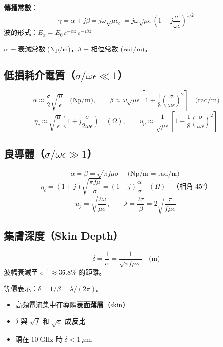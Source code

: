 \documentclass[12pt,a4paper]{article}
\begin{document}
\textbf{傳播常數}：
\[
\gamma = \alpha + j\beta = j\omega\sqrt{\mu\epsilon_c} = j\omega\sqrt{\mu\epsilon}\left(1-j\frac{\sigma}{\omega\epsilon}\right)^{1/2}
\]
波的形式：$E_x = E_0\,e^{-\alpha z}\,e^{-j\beta z}$

$\alpha$ = 衰減常數 (Np/m)，$\beta$ = 相位常數 (rad/m)。

\subsection{低損耗介電質（$\sigma/\omega\epsilon \ll 1$）}

\begin{keybox}[低損耗介電質公式]
\[
\alpha \approx \frac{\sigma}{2}\sqrt{\frac{\mu}{\epsilon}} \quad\text{(Np/m)}, \qquad
\beta \approx \omega\sqrt{\mu\epsilon}\left[1+\frac{1}{8}\left(\frac{\sigma}{\omega\epsilon}\right)^2\right] \quad\text{(rad/m)}
\]
\[
\eta_c \approx \sqrt{\frac{\mu}{\epsilon}}\left(1+j\frac{\sigma}{2\omega\epsilon}\right) \quad(\Omega), \qquad
u_p \approx \frac{1}{\sqrt{\mu\epsilon}}\left[1-\frac{1}{8}\left(\frac{\sigma}{\omega\epsilon}\right)^2\right]
\]
\end{keybox}

\subsection{良導體（$\sigma/\omega\epsilon \gg 1$）}

\begin{keybox}[良導體公式]
\[
\alpha = \beta = \sqrt{\pi f\mu\sigma} \quad\text{(Np/m $=$ rad/m)}
\]
\[
\eta_c = (1+j)\sqrt{\frac{\pi f\mu}{\sigma}} = (1+j)\frac{\alpha}{\sigma} \quad(\Omega) \quad\text{（相角 $45°$）}
\]
\[
u_p = \sqrt{\frac{2\omega}{\mu\sigma}}, \qquad
\lambda = \frac{2\pi}{\beta} = 2\sqrt{\frac{\pi}{f\mu\sigma}}
\]
\end{keybox}

\subsection{集膚深度（Skin Depth）}

\begin{keybox}[集膚深度]
\[
\boxed{\delta = \frac{1}{\alpha} = \frac{1}{\sqrt{\pi f\mu\sigma}}} \quad\text{(m)}
\]
波幅衰減至 $e^{-1} \approx 36.8\%$ 的距離。

等價表示：$\delta = 1/\beta = \lambda/(2\pi)$。
\end{keybox}

\begin{tipbox}[集膚深度的物理意義]
\begin{itemize}[nosep]
  \item 高頻電流集中在導體\textbf{表面薄層}（skin）
  \item $\delta$ 與 $\sqrt{f}$ 和 $\sqrt{\sigma}$ 成\textbf{反比}
  \item 銅在 $10\;\text{GHz}$ 時 $\delta < 1\;\mu\text{m}$
\end{itemize}
\end{tipbox}
\end{document}
